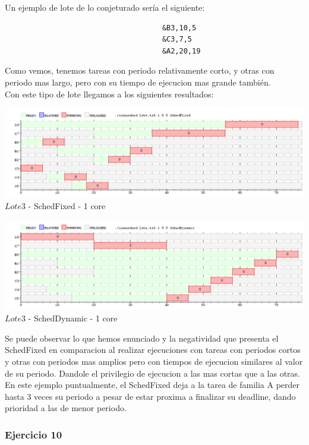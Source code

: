 Un ejemplo de lote de lo conjeturado sería el siguiente:\\


\begin{verbatim}
                                     &B3,10,5
                                     &C3,7,5
                                     &A2,20,19

\end{verbatim}
 



Como vemos, tenemos tareas con periodo relativamente corto, y otras con periodo mas largo, pero con su tiempo de ejecucion mas grande
también.\\

Con este tipo de lote llegamos a los siguientes resultados:\\

\begin{center}
    	\includegraphics[width=450pt]{Fixed8c.png}
	{$Lote 3$ - SchedFixed - 1 core }	
 \end{center}


\begin{center}
    	\includegraphics[width=450pt]{Dynamic8c.png}
	{$Lote 3$ - SchedDynamic - 1 core }	
 \end{center}

Se puede observar lo que hemos enunciado y la negatividad que presenta el SchedFixed en comparacion al realizar ejecuciones
con tareas con periodos cortos y otras con periodos mas amplios pero con tiempos de ejecucion similares al valor de su periodo. Dandole
el privilegio de ejecucion a las mas cortas que a las otras. En este ejemplo puntualmente, el SchedFixed deja a la tarea de familia
A perder hasta 3 veces su periodo a pesar de estar proxima a finalizar su deadline, dando prioridad a las de menor periodo.\\


\subsubsection[Resolución Ejercicio 10]{Ejercicio 10}
